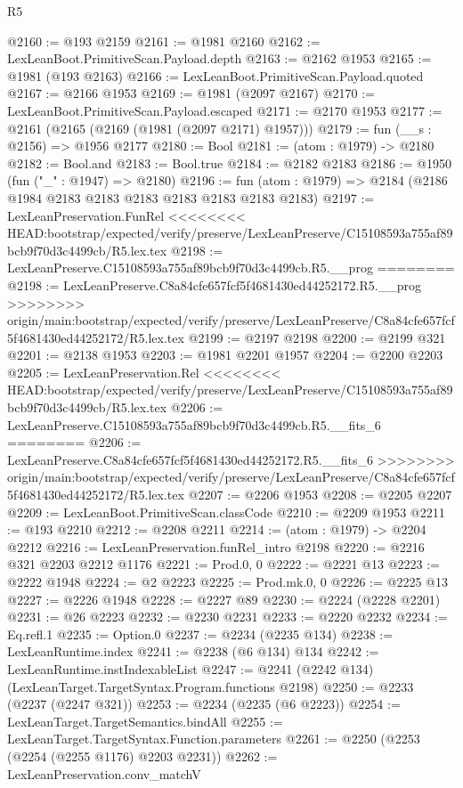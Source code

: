 \begin{lexlean}{R5}
\begin{coremodule}
{{{{{{{{{{{{{{{{{{{{{{{{{{{{{{{{{{{{{{{{{{{{{{{{{{{{{{{{{{{{{{@2160 := @193 @2159
@2161 := @1981 @2160
@2162 := LexLeanBoot.PrimitiveScan.Payload.depth
@2163 := @2162 @1953
@2165 := @1981 (@193 @2163)
@2166 := LexLeanBoot.PrimitiveScan.Payload.quoted
@2167 := @2166 @1953
@2169 := @1981 (@2097 @2167)
@2170 := LexLeanBoot.PrimitiveScan.Payload.escaped
@2171 := @2170 @1953
@2177 := @2161 (@2165 (@2169 (@1981 (@2097 @2171) @1957)))
@2179 := fun (__s : @2156) => @1956 @2177
@2180 := Bool
@2181 := (atom : @1979) -> @2180
@2182 := Bool.and
@2183 := Bool.true
@2184 := @2182 @2183
@2186 := @1950 (fun ("_" : @1947) => @2180)
@2196 := fun (atom : @1979) => @2184 (@2186 @1984 @2183 @2183 @2183 @2183 @2183 @2183 @2183)
@2197 := LexLeanPreservation.FunRel
<<<<<<<< HEAD:bootstrap/expected/verify/preserve/LexLeanPreserve/C15108593a755af89bcb9f70d3c4499cb/R5.lex.tex
@2198 := LexLeanPreserve.C15108593a755af89bcb9f70d3c4499cb.R5.__prog
========
@2198 := LexLeanPreserve.C8a84cfe657fcf5f4681430ed44252172.R5.__prog
>>>>>>>> origin/main:bootstrap/expected/verify/preserve/LexLeanPreserve/C8a84cfe657fcf5f4681430ed44252172/R5.lex.tex
@2199 := @2197 @2198
@2200 := @2199 @321
@2201 := @2138 @1953
@2203 := @1981 @2201 @1957
@2204 := @2200 @2203
@2205 := LexLeanPreservation.Rel
<<<<<<<< HEAD:bootstrap/expected/verify/preserve/LexLeanPreserve/C15108593a755af89bcb9f70d3c4499cb/R5.lex.tex
@2206 := LexLeanPreserve.C15108593a755af89bcb9f70d3c4499cb.R5.__fits_6
========
@2206 := LexLeanPreserve.C8a84cfe657fcf5f4681430ed44252172.R5.__fits_6
>>>>>>>> origin/main:bootstrap/expected/verify/preserve/LexLeanPreserve/C8a84cfe657fcf5f4681430ed44252172/R5.lex.tex
@2207 := @2206 @1953
@2208 := @2205 @2207
@2209 := LexLeanBoot.PrimitiveScan.classCode
@2210 := @2209 @1953
@2211 := @193 @2210
@2212 := @2208 @2211
@2214 := (atom : @1979) -> @2204 @2212
@2216 := LexLeanPreservation.funRel_intro @2198
@2220 := @2216 @321 @2203 @2212 @1176
@2221 := Prod.{0, 0}
@2222 := @2221 @13
@2223 := @2222 @1948
@2224 := @2 @2223
@2225 := Prod.mk.{0, 0}
@2226 := @2225 @13
@2227 := @2226 @1948
@2228 := @2227 @89
@2230 := @2224 (@2228 @2201)
@2231 := @26 @2223
@2232 := @2230 @2231
@2233 := @2220 @2232
@2234 := Eq.refl.{1}
@2235 := Option.{0}
@2237 := @2234 (@2235 @134)
@2238 := LexLeanRuntime.index
@2241 := @2238 (@6 @134) @134
@2242 := LexLeanRuntime.instIndexableList
@2247 := @2241 (@2242 @134) (LexLeanTarget.TargetSyntax.Program.functions @2198)
@2250 := @2233 (@2237 (@2247 @321))
@2253 := @2234 (@2235 (@6 @2223))
@2254 := LexLeanTarget.TargetSemantics.bindAll
@2255 := LexLeanTarget.TargetSyntax.Function.parameters
@2261 := @2250 (@2253 (@2254 (@2255 @1176) @2203 @2231))
@2262 := LexLeanPreservation.conv_matchV
}}}}}}}}}}}}}}}}}}}}}}}}}}}}}}}}}}}}}}}}}}}}}}}}}}}}}}}}}}}}}}
\end{coremodule}
\end{lexlean}
